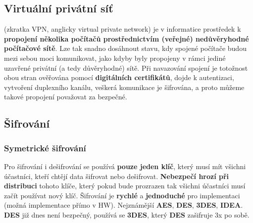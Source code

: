 \subsection{Virtuální privátní síť }
(zkratka VPN, anglicky virtual private network) je v informatice prostředek k \textbf{propojení několika počítačů prostřednictvím (veřejné) nedůvěryhodné počítačové sítě}. Lze tak snadno dosáhnout stavu, kdy spojené počítače budou mezi sebou moci komunikovat, jako kdyby byly propojeny v rámci jediné uzavřené privátní (a tedy důvěryhodné) sítě. Při navazování spojení je totožnost obou stran ověřována pomocí \textbf{digitálních certifikátů}, dojde k autentizaci, vytvoření duplexního kanálu, veškerá komunikace je šifrována, a proto můžeme takové propojení považovat za bezpečné.

\subsection{Šifrování}
\subsubsection{Symetrické šifrování}
Pro šifrování i dešifrování se používá \textbf{pouze jeden klíč}, který musí mít všichni účastníci, kteří chtějí data šifrovat nebo dešifrovat. \textbf{Nebezpečí hrozí při distribuci }tohoto klíče, který pokud bude prozrazen tak všichni účastníci musí začít používat nový klíč.  Šifrování je \textbf{rychlé} a \textbf{jednoduché} pro implementaci (možná implementace přímo v HW). Nejznámější \textbf{AES},	 \textbf{DES}, \textbf{3DES}, \textbf{IDEA}. \textbf{DES} již dnes není bezpečný, používá se \textbf{3DES}, který \textbf{DES} zašifruje 3x po sobě.
\\\\
\noindent{}


